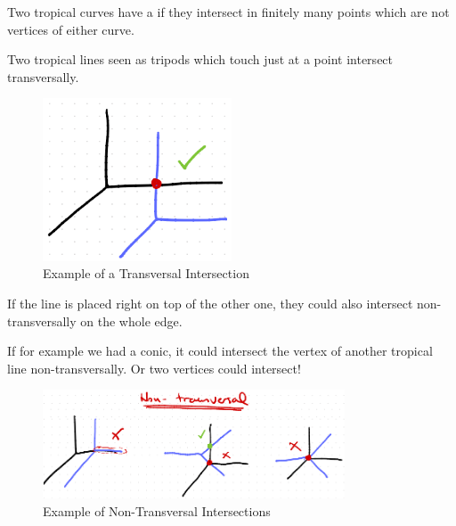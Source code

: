 \documentclass[12pt]{memoir}
\theoremstyle{definition}
\begin{document}
\begin{Def}
    Two tropical curves have a  if they intersect in finitely many points which are not vertices of either curve.
\end{Def}

\begin{Ex}
    Two tropical lines seen as tripods which touch just at a point intersect transversally. 
    \begin{figure}[h!]
        \centering
        \includegraphics[width=0.5\textwidth]{figs/fig11-1-TransversalIntersectionExample.png}
        \caption{Example of a Transversal Intersection}
        \label{fig:11.1-TransversalIntersectionExample}
    \end{figure}
\end{Ex}

\begin{Ex}
    If the line is placed right on top of the other one, they could also intersect non-transversally on the whole edge.\par 
    If for example we had a conic, it could intersect the vertex of another tropical line non-transversally. Or two vertices could intersect!
    \begin{figure}[h!]
        \centering
        \includegraphics[width=0.8\textwidth]{figs/fig11-2-NonTransversalIntersectionExample.png}
        \caption{Example of Non-Transversal Intersections}
        \label{fig:11.2-NonTransversalIntersectionExample}
    \end{figure}
\end{Ex}
\end{document}
